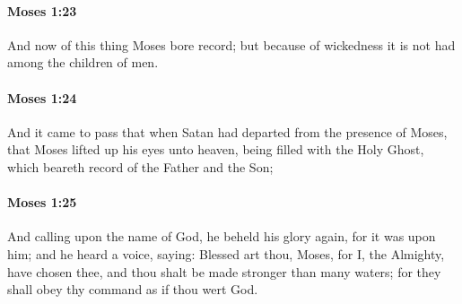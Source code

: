 		\paragraph{Moses 1:23} %
			\label{MOSES-1-23}

			And now of this thing Moses bore record; but because of wickedness it is not had among the children of men.


		\paragraph{Moses 1:24} %
			\label{MOSES-1-24}

			And it came to pass that when Satan had departed from the presence of Moses, that Moses lifted up his eyes unto heaven, being filled with the Holy Ghost, which beareth record of the Father and the Son;


		\paragraph{Moses 1:25} %
			\label{MOSES-1-25}

			And calling upon the name of God, he beheld his glory again, for it was upon him; and he heard a voice, saying: Blessed art thou, Moses, for I, the Almighty, have chosen thee, and thou shalt be made stronger than many waters; for they shall obey thy command as if thou wert God.


